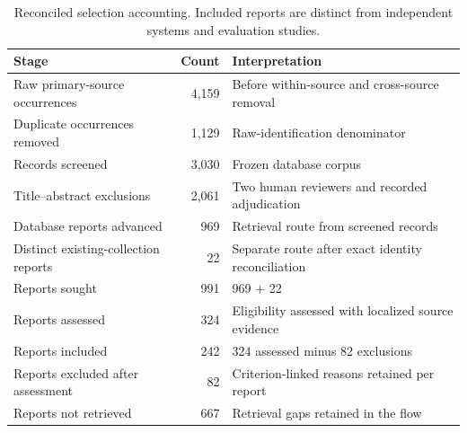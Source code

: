 \documentclass[manuscript,review,screen]{acmart}
\begin{document}
\begin{table}[htbp]
\centering\small
\caption{Reconciled selection accounting. Included reports are distinct from independent systems and evaluation studies.}
\label{tab:flow}
\begin{tabularx}{\linewidth}{Y r Y}
\toprule Stage & Count & Interpretation\\\midrule
Raw primary-source occurrences & 4,159 & Before within-source and cross-source removal\\
Duplicate occurrences removed & 1,129 & Raw-identification denominator\\
Records screened & 3,030 & Frozen database corpus\\
Title--abstract exclusions & 2,061 & Two human reviewers and recorded adjudication\\
Database reports advanced & 969 & Retrieval route from screened records\\
Distinct existing-collection reports & 22 & Separate route after exact identity reconciliation\\
Reports sought & 991 & 969 + 22\\
Reports assessed & 324 & Eligibility assessed with localized source evidence\\
Reports included & 242 & 324 assessed minus 82 exclusions\\
Reports excluded after assessment & 82 & Criterion-linked reasons retained per report\\
Reports not retrieved & 667 & Retrieval gaps retained in the flow\\\bottomrule
\end{tabularx}
\end{table}
\end{document}
